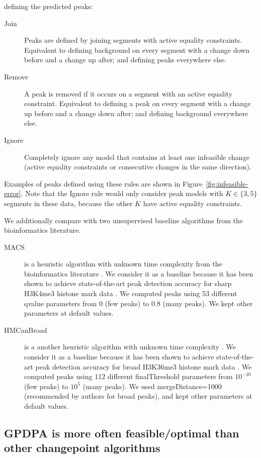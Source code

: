 \documentclass[twoside,11pt]{article}
\begin{document}
defining the predicted peaks:
\begin{description}
\item[Join] Peaks are defined by joining segments with
  active equality constraints. Equivalent
  to defining background on every segment with a change down before
  and a change up after; and defining peaks everywhere else.
\item[Remove] A peak is removed if it occurs on a segment with an
  active equality constraint. Equivalent to defining a peak on every
  segment with a change up before and a change down after; and
  defining background everywhere else.
\item[Ignore] Completely ignore any model that contains at least one
  infeasible change (active equality constraints or consecutive
  changes in the same direction).
\end{description}
Examples of peaks defined using these rules are shown in
Figure~\ref{fig:infeasible-error}. Note that the Ignore rule would
only consider peak models with $K\in\{3,5\}$ segments in these data,
because the other $K$ have active equality constraints.

We additionally compare with two unsupervised baseline algorithms from the
bioinformatics literature. 
\begin{description}
\item[MACS] is a heuristic algorithm with unknown time complexity from
  the bioinformatics literature \citep{MACS}. We consider it as a
  baseline because it has been shown to achieve state-of-the-art peak
  detection accuracy for sharp H3K4me3 histone mark data
  \citep{HOCKING-PeakSeg}. We computed peaks using 53 different qvalue
  parameters from 0 (few peaks) to 0.8 (many peaks). We kept other parameters at default values.
\item[HMCanBroad] is a another heuristic algorithm with unknown time
  complexity \citep{HMCan}. We consider it as a baseline because it
  has been shown to achieve state-of-the-art peak detection accuracy
  for broad H3K36me3 histone mark data \citep{HOCKING-PeakSeg}. We
  computed peaks using 112 different finalThreshold parameters from
  $10^{-10}$ (few peaks) to $10^5$ (many peaks). We used
  mergeDistance=1000 (recommended by authors for broad peaks), and
  kept other parameters at default values.
\end{description}

\subsection{GPDPA is more often feasible/optimal than other changepoint algorithms}
\end{document}
